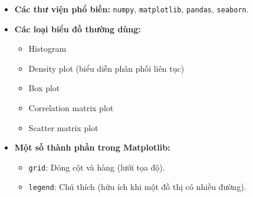 \begin{itemize}
    \item \textbf{Các thư viện phổ biến:} \texttt{numpy}, \texttt{matplotlib}, \texttt{pandas}, \texttt{seaborn}.
    \item \textbf{Các loại biểu đồ thường dùng:}
    \begin{itemize}
        \item Histogram
        \item Density plot (biểu diễn phân phối liên tục)
        \item Box plot
        \item Correlation matrix plot
        \item Scatter matrix plot
    \end{itemize}
    \item \textbf{Một số thành phần trong Matplotlib:}
    \begin{itemize}
        \item \texttt{grid}: Dóng cột và hàng (lưới tọa độ).
        \item \texttt{legend}: Chú thích (hữu ích khi một đồ thị có nhiều đường).
    \end{itemize}
\end{itemize}